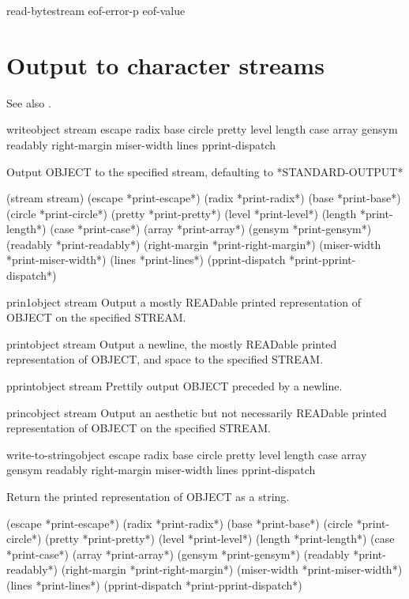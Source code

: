 \documentclass[10pt,english]{book}
\begin{document}
\begin{function}{read-byte}{stream \op eof-error-p eof-value}
  
\end{function}

\section{Output to character streams}
\label{sec:outp-char-stre}

See also .

\begin{function}{write}{object \key stream escape radix base circle
    pretty level length case array gensym readably right-margin
    miser-width lines pprint-dispatch}

  Output OBJECT to the specified stream, defaulting to
  *STANDARD-OUTPUT*

(stream stream) (escape *print-escape*) (radix *print-radix*)
 (base *print-base*) (circle *print-circle*) (pretty *print-pretty*)
 (level *print-level*) (length *print-length*) (case *print-case*)
 (array *print-array*) (gensym *print-gensym*) (readably *print-readably*)
 (right-margin *print-right-margin*) (miser-width *print-miser-width*)
 (lines *print-lines*) (pprint-dispatch *print-pprint-dispatch*)
\end{function}

\begin{function}{prin1}{object \op stream}
  Output a mostly READable printed representation of OBJECT on the specified
  STREAM.
\end{function}

\begin{function}{print}{object \op stream}
  Output a newline, the mostly READable printed representation of OBJECT, and
  space to the specified STREAM.
\end{function}

\begin{function}{pprint}{object \op stream}
  Prettily output OBJECT preceded by a newline.
\end{function}

\begin{function}{princ}{object \op stream}
  Output an aesthetic but not necessarily READable printed representation
  of OBJECT on the specified STREAM.
\end{function}

\begin{function}{write-to-string}{object \key escape radix base circle
    pretty level length case array gensym readably right-margin
    miser-width lines pprint-dispatch}

  Return the printed representation of OBJECT as a string.

(escape *print-escape*) (radix *print-radix*) (base *print-base*)
 (circle *print-circle*) (pretty *print-pretty*) (level *print-level*)
 (length *print-length*) (case *print-case*) (array *print-array*)
 (gensym *print-gensym*) (readably *print-readably*)
 (right-margin *print-right-margin*) (miser-width *print-miser-width*)
 (lines *print-lines*) (pprint-dispatch *print-pprint-dispatch*)
\end{function}
\end{document}
